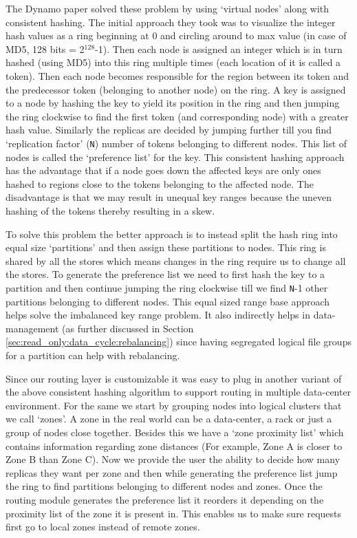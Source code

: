 \documentclass[10pt,twocolumn,preprint,natbib,authoryear]{sigplanconf}
\begin{document}
The Dynamo paper solved these problem by using `virtual nodes' along with consistent hashing. The initial approach they took was to visualize the integer hash values as a ring beginning at 0 and circling around to max value (in case of MD5, 128 bits = 2$^{128}$-1). Then each node is assigned an integer which is in turn hashed (using MD5) into this ring multiple times (each location of it is called a token). Then each node becomes responsible for the region between its token and the predecessor token (belonging to another node) on the ring. A key is assigned to a node by hashing the key to yield its position in the ring and then jumping the ring clockwise to find the first token (and corresponding node) with a greater hash value. Similarly the replicas are decided by jumping further till you find `replication factor' (\verb=N=) number of tokens belonging to different nodes. This list of nodes is called the `preference list' for the key. This consistent hashing approach has the advantage that if a node goes down the affected keys are only ones hashed to regions close to the tokens belonging to the affected node. The disadvantage is that we may result in unequal key ranges because the uneven hashing of the tokens thereby resulting in a skew. 

To solve this problem the better approach is to instead split the hash ring into equal size `partitions' and then assign these partitions to nodes. This ring is shared by all the stores which means changes in the ring require us to change all the stores. To generate the preference list we need to first hash the key to a partition and then continue jumping the ring clockwise till we find \verb=N=-1 other partitions belonging to different nodes. This equal sized range base approach helps solve the imbalanced key range problem. It also indirectly helps in data-management (as further discussed in Section \ref{sec:read_only:data_cycle:rebalancing}) since having segregated logical file groups for a partition can help with rebalancing. 

Since our routing layer is customizable it was easy to plug in another variant of the above consistent hashing algorithm to support routing in multiple data-center environment. For the same we start by grouping nodes into logical clusters that we call `zones'. A zone in the real world can be a data-center, a rack or just a group of nodes close together. Besides this we have a `zone proximity list' which contains information regarding zone distances (For example, Zone A is closer to Zone B than Zone C). Now we provide the user the ability to decide how many replicas they want per zone and then while generating the preference list jump the ring to find partitions belonging to different nodes and zones. Once the routing module generates the preference list it reorders it depending on the proximity list of the zone it is present in. This enables us to make sure requests first go to local zones instead of remote zones. 
\end{document}
